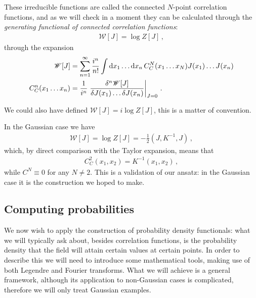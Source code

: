 \documentclass[main.tex]{subfiles}
\begin{document}

These irreducible functions are called the connected \(N\)-point correlation functions, and as we will check in a moment they can be calculated through the \emph{generating functional of connected correlation functions}:
%
\begin{align}
\mathscr{W}[J] = \log Z[J]
\,,
\end{align}
%
through the expansion 
%
\begin{align}
\mathscr{W}[J] &= \sum _{n=1}^{\infty } \frac{i^{n}}{n!} \int \dd{x_1} \dots \dd{x_n} C^{N}_{C} (x_1 \dots x_N) J(x_1) \dots J(x_n)  \\
C^{n}_C (x_1 \dots x_n) &= \frac{1}{i^{n}} 
\eval{\frac{ \delta^{n} \mathscr{W}[J]}{\delta  J(x_1) \dots \delta J(x_n) }}_{J = 0}
\,.
\end{align}


We could also have defined \(\mathscr{W}[J] = i \log Z[J]\), this is a matter of convention. 

In the Gaussian case we have 
%
\begin{align}
\mathscr{W}[J] = \log Z[J] = - \frac{1}{2} (J, K^{-1}, J)  
\,,
\end{align}
%
which, by direct comparison with the Taylor expansion, means that 
%
\begin{align}
C^{2}_{C} (x_1 , x_2 ) = K^{-1} (x_1 , x_2 )
\,,
\end{align}
%
while \(C^{N} \equiv 0\) for any \(N \neq 2\). 
This is a validation of our ansatz: in the Gaussian case it is the construction we hoped to make. 

\subsection{Computing probabilities}

We now wish to apply the construction of probability density functionals: what we will typically ask about, besides correlation functions, is the probability density that the field will attain certain values at certain points.
In order to describe this we will need to introduce some mathematical tools, making use of both Legendre and Fourier transforms. 
What we will achieve is a general framework, although its application to non-Gaussian cases is complicated, therefore we will only treat Gaussian examples. 
\end{document}
